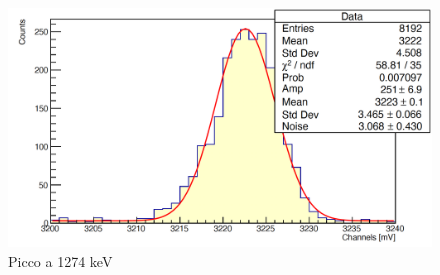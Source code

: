 \documentclass[a4paper,10pt]{article}
\begin{document}
\begin{figure}[H]
    \centering
    \includegraphics[scale=0.45]{appendice/spettri/NaA2_20}
    \caption{Picco a 1274 keV}
\end{figure}
\end{document}
